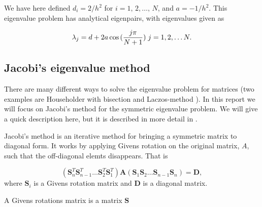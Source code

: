 \documentclass{emulateapj}
\begin{document}
        We have here defined \(d_{i}=2/h^2\) for \(i=1,\,2,\ldots,\,N\), and \(a=-1/h^2\). This eigenvalue problem has analytical eigenpairs, with eigenvalues given as \cite[page 154]{eigenvalues_beam}
        
        \begin{equation*}
            \lambda_j = d+2a\cos{(\frac{j\pi}{N+1})} \hspace{0.1cm} j=1,2,\dots N.
        \end{equation*}

    \subsection{\textbf{Jacobi's eigenvalue method}}
    
        There are many different ways to solve the eigenvalue problem for matrices (two examples are Householder with bisection \cite[chapter 8]{jacobis_method} and Laczos-method \cite[chapter 7]{compfys}). In this report we will focus on Jacobi's method for the symmetric eigenvalue problem. We will give a quick description here, but it is described in more detail in \cite[chapter 8.5]{jacobis_method}.
        
        Jacobi's method is an iterative method for bringing a symmetric matrix to diagonal form. It works by applying Givens rotation \cite[Chapter 5]{jacobis_method} on the original matrix, \(A\), such that the off-diagonal elemts disappears. %
        That is
        
        \begin{equation*}
            \left(\bm{S}_{n}^T\bm{S}_{n-1}^T\ldots\bm{S}_{2}^T\bm{S}_{1}^T\right) \bm{A} \left(\bm{S}_{1}\bm{S}_{2}\ldots\bm{S}_{n-1}\bm{S}_{n}\right) = \bm{D},
        \end{equation*}
        where \(\bm{S}_{i}\) is a Givens rotation matrix and \(\bm{D}\) is a diagonal matrix. 
        
        A Givens rotations matrix is a matrix \(\bm{S}\)  %
        
\end{document}
